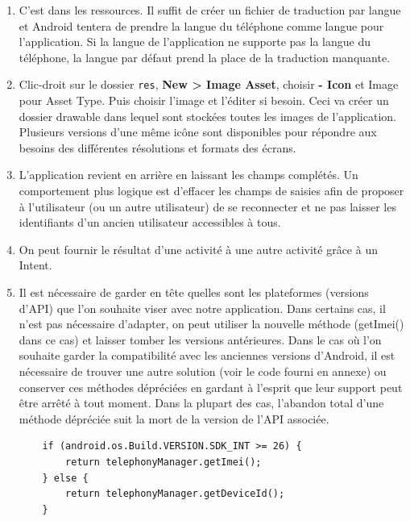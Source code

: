\documentclass[a4paper]{article}
\begin{document}
\begin{enumerate}
	\item C'est dans les ressources. Il suffit de créer un fichier de traduction par langue et Android tentera de prendre la langue du téléphone comme langue pour l'application.
    Si la langue de l'application ne supporte pas la langue du téléphone, la langue par défaut prend la place de la traduction manquante.
	
    \item Clic-droit sur le dossier 
    \lstinline{res}, \textbf{New > Image Asset}, choisir \textbf{- Icon} et Image pour Asset Type. Puis choisir l'image et l'éditer si besoin. Ceci va créer un dossier drawable dans lequel sont stockées toutes les images de l'application. Plusieurs versions d'une même icône sont disponibles pour répondre aux besoins des différentes résolutions et formats des écrans.
    
    \item L'application revient en arrière en laissant les champs complétés. Un comportement plus logique est d'effacer les champs de saisies afin de proposer à l'utilisateur (ou un autre utilisateur) de se reconnecter et ne pas laisser les identifiants d'un ancien utilisateur accessibles à tous.
    
    \item On peut fournir le résultat d'une activité à une autre activité grâce à un Intent.
    
    \item Il est nécessaire de garder en tête quelles sont les plateformes (versions d'API) que l'on souhaite viser avec notre application. Dans certains cas, il n'est pas nécessaire d'adapter, on peut utiliser la nouvelle méthode (getImei() dans ce cas) et laisser tomber les versions antérieures. Dans le cas où l'on souhaite garder la compatibilité avec les anciennes versions d'Android, il est nécessaire de trouver une autre solution (voir le code fourni en annexe) ou conserver ces méthodes dépréciées en gardant à l'esprit que leur support peut être arrêté à tout moment. Dans la plupart des cas, l'abandon total d'une méthode dépréciée suit la mort de la version de l'API associée.
    
    \begin{lstlisting}
    if (android.os.Build.VERSION.SDK_INT >= 26) {
        return telephonyManager.getImei();
    } else {
        return telephonyManager.getDeviceId();
    }
    \end{lstlisting}
    

\end{enumerate}
\end{document}
